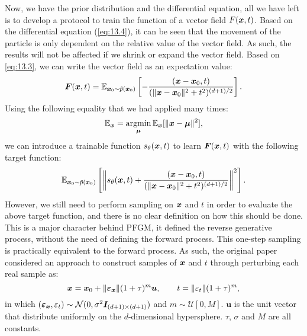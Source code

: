 Now, we have the prior distribution and the differential equation, all we have left is to develop a protocol to train the function of a vector field $F(\bm{x},t)$. Based on the differential equation (\ref{eq:13.4}), it can be seen that the movement of the particle is only dependent on the relative value of the vector field. As such, the results will not be affected if we shrink or expand the vector field. Based on \cref{eq:13.3}, we can write the vector field as an expectation value:
\begin{equation}
    \label{eq:13.8}
    \bm{F}(\bm{x},t)=\mathbb{E}_{\bm{x}_0\sim\tilde{p}(\bm{x}_{0})}\left[ -\frac{(\bm{x}-\bm{x}_0,t)}{(\|\bm{x}-\bm{x}_0\|^2+t^2)^{(d+1)/2}}\right].
\end{equation}
Using the following equality that we had applied many times:
\begin{equation}
    \label{eq:13.9}
    \mathbb{E}_{\bm{x}}=\operatorname*{argmin}_{\bm{\mu}}\mathbb{E}_{\bm{x}}[\|\bm{x}-\bm{\mu}\|^2],
\end{equation}
we  can introduce a trainable function $s_\theta(\bm{x},t)$ to learn $\bm{F}(\bm{x},t)$ with the following target function:
\begin{equation}
    \label{eq:13.10}
    \mathbb{E}_{\bm{x}_0\sim\tilde{p}(\bm{x}_{0})}\left[ \left\|  s_\theta(\bm{x},t)  + \frac{(\bm{x}-\bm{x}_0,t)}{(\|\bm{x}-\bm{x}_0\|^2+t^2)^{(d+1)/2}}\right\|^2\right].
\end{equation}
However, we still need to perform sampling on $\bm{x}$ and $t$ in order to evaluate the above target function, and there is no clear definition on how this should be done. This is a major character behind PFGM, it defined the reverse generative process, without the need of defining the forward process. This one-step sampling is practically equivalent to the forward process. As such, the original paper considered an approach to construct samples of $\bm{x}$ and $t$ through perturbing each real sample as:
\begin{equation}
\label{eq:13.11}
    \bm{x}=\bm{x}_0+\|\bm{\varepsilon}_{\bm{x}}\|(1+\tau)^{m}\bm{u},\qquad t=\|\varepsilon_t\|(1+\tau)^{m},
\end{equation}
in which $(\bm{\varepsilon}_{\bm{x}},\varepsilon_t)\sim\mathcal{N}(0,\sigma^2\bm{I}_{(d+1)\times(d+1)})$ and $m\sim\mathcal{U}[0,M]$. $\bm{u}$ is the unit vector that distribute uniformly on the $d$-dimensional hypersphere. $\tau$, $\sigma$ and $M$ are all constants.

